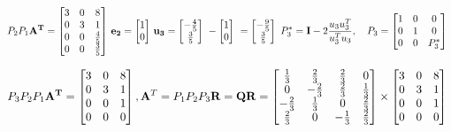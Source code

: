 \documentclass[english,onecolumn]{IEEEtran}
\def\Q{\mathbf{Q}}
\def\A{\mathbf{A}}
\def\R{\mathbf{R}}
\begin{document}
\begin{enumerate}
	 \[
	{P_2 P_1\bf A^T}=
	\begin{bmatrix}
		3&0&8\\
		0&3&1\\
		0&0&\frac{4}{5}\\
		0&0&\frac{3}{5}
	\end{bmatrix}\,
	{\bf e_2}=
	\begin{bmatrix}
		1\\
		0
	\end{bmatrix}\,
	{\bf u_3}=
	\begin{bmatrix}
		-\frac{4}{5}\\
		\frac{3}{5}
	\end{bmatrix}\
	-
	\begin{bmatrix}
		1\\
		0
	\end{bmatrix}\
	=
	\begin{bmatrix}
		-\frac{9}{5}\\
		\frac{3}{5}
	\end{bmatrix}\
	P_3^* = \textbf{I} - 2 \frac{u_3 u_3^T}{u_3^T u_3}, \quad
	P_3 = 
	\begin{bmatrix}
		1&0&0\\
		0&1&0\\
		0&0&P_3^*\\
	\end{bmatrix}\
\]


 \[
{P_3 P_2 P_1\bf A^T}=
\begin{bmatrix}
	3&0&8\\
	0&3&1\\
	0&0&1\\
	0&0&0
\end{bmatrix},
\A^T=P_1 P_2 P_3 \R= \Q\R=
\begin{bmatrix}
	\frac{1}{3}&\frac{2}{3}&\frac{2}{3}&0\\
	0&-\frac{2}{3}&\frac{2}{3}&\frac{1}{3}\\
	-\frac{2}{3}&\frac{1}{3}&0&\frac{2}{3}\\
	\frac{2}{3}&0&-\frac{1}{3}&\frac{2}{3}
\end{bmatrix} \times
\begin{bmatrix}
	3&0&8\\
	0&3&1\\
	0&0&1\\
	0&0&0
\end{bmatrix}\
\]


\end{enumerate}
\end{document}

